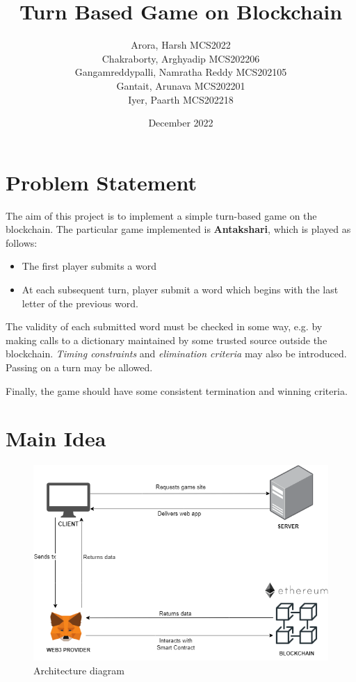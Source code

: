 \documentclass{article}
\title{Turn Based Game on Blockchain}
\author{Arora, Harsh MCS2022 \\
        Chakraborty, Arghyadip MCS202206 \\
        Gangamreddypalli, Namratha Reddy MCS202105 \\
        Gantait, Arunava MCS202201 \\
        Iyer, Paarth MCS202218}
\date{December 2022}
\begin{document}
\maketitle
\newpage
\tableofcontents
\newpage

\section{Problem Statement}
The aim of this project is to implement a simple turn-based game on the blockchain.
The particular game implemented is \textbf{Antakshari}, which is played   as follows:
\begin{itemize}
    \item The first player submits a word
    \item At each subsequent turn, player submit a word which begins with the last letter of the previous word.
\end{itemize}
The validity of each submitted word must be checked in some way, e.g. by making calls
to a dictionary maintained by some trusted source outside the blockchain. \textit{Timing constraints} and \textit{elimination criteria} may also be introduced. Passing on a turn may be allowed.



Finally, the game should have some consistent termination and winning criteria.
\section{Main Idea}


\begin{figure}[htp]
    \centering
    \includegraphics[scale=0.5]{images/arch.png}
    \caption{Architecture diagram}
\end{figure}
\end{document}
